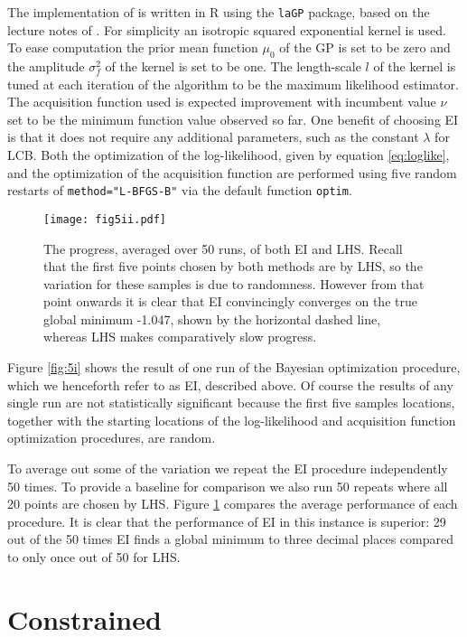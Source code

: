 The implementation of is written in R using the \texttt{laGP} \cite{gramacy2016lagp} package, based on the lecture notes of \citet{lectures}. For simplicity an isotropic squared exponential kernel is used. To ease computation the prior mean function $\mu_0$ of the GP is set to be zero and the amplitude $\sigma_f^2$ of the kernel is set to be one. The length-scale $l$ of the kernel is tuned at each iteration of the algorithm to be the maximum likelihood estimator. The acquisition function used is expected improvement with incumbent value $\nu$ set to be the minimum function value observed so far. One benefit of choosing EI is that it does not require any additional parameters, such as the constant $\lambda$ for LCB. Both the optimization of the log-likelihood, given by equation \ref{eq:loglike}, and the optimization of the acquisition function are performed using five random restarts of \texttt{method="L-BFGS-B"} via the default function \texttt{optim}.

\begin{figure}
\centering
\texttt{[image: fig5ii.pdf]}
\caption{The progress, averaged over 50 runs, of both EI and LHS. Recall that the first five points chosen by both methods are by LHS, so the variation for these samples is due to randomness. However from that point onwards it is clear that EI convincingly converges on the true global minimum -1.047, shown by the horizontal dashed line, whereas LHS makes comparatively slow progress.} \label{fig:5ii}
\end{figure}

Figure \ref{fig:5i} shows the result of one run of the Bayesian optimization procedure, which we henceforth refer to as EI, described above. Of course the results of any single run are not statistically significant because the first five samples locations, together with the starting locations of the log-likelihood and acquisition function optimization procedures, are random.  

To average out some of the variation we repeat the EI procedure independently 50 times. To provide a baseline for comparison we also run 50 repeats where all 20 points are chosen by LHS. Figure \ref{fig:5ii} compares the average performance of each procedure. It is clear that the performance of EI in this instance is superior: 29 out of the 50 times EI finds a global minimum to three decimal places compared to only once out of 50 for LHS. 

\section{Constrained} \label{experiment2}

